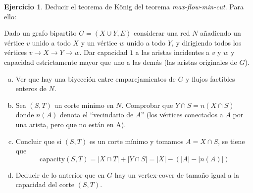 \documentclass[10pt]{article}
\theoremstyle{definition}
\newtheorem{ejer}{Ejercicio}
\begin{document}
\begin{ejer}Deducir el teorema de König del teorema \textit{max-flow-min-cut}. Para ello:

Dado un grafo bipartito $G=(X\cup Y,E)$ considerar una red $N$ añadiendo un vértice $v$ unido a todo $X$ y un vértice $w$ unido a todo $Y$, y dirigiendo todos los vértices $v\longrightarrow X\longrightarrow Y\longrightarrow w$. Dar capacidad $1$ a las aristas incidentes a $v$ y $w$ y capacidad estrictamente mayor que uno a las demás (las aristas originales de $G$).
\begin{enumerate}[(a)]
\item Ver que hay una biyección entre emparejamientos de $G$ y flujos factibles enteros de $N$.



\item Sea $(S, T)$ un corte mínimo en $N$. Comprobar que $Y\cap S=n(X\cap S)$ donde $n(A)$ denota el ``vecindario de $A$'' (los vértices conectados a $A$ por una arista, pero que no están en A).


\item Concluir que si $(S, T)$ es un corte mínimo y tomamos $A=X\cap S$, se tiene que 
$$\text{capacity}(S,T)=|X\cap T|+|Y\cap S|=|X|-(|A|-|n(A)|)$$

\item Deducir de lo anterior que en $G$ hay un vertex-cover de tamaño igual a la capacidad del corte $(S,T)$.

\end{enumerate}\end{ejer}
\end{document}
